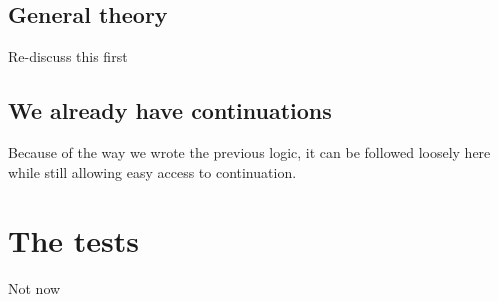 \documentclass{article}
\newcommand\SC[1]{{\color{violet}{\it \bf Simon :} #1}}
\begin{document}
	\subsection{General theory}

	\SC{Re-discuss this first}

	\subsection{We already have continuations}

	Because of the way we wrote the previous logic, it can be followed loosely here while still allowing easy access to continuation.


\section{The tests}

\SC{Not now}
\end{document}
